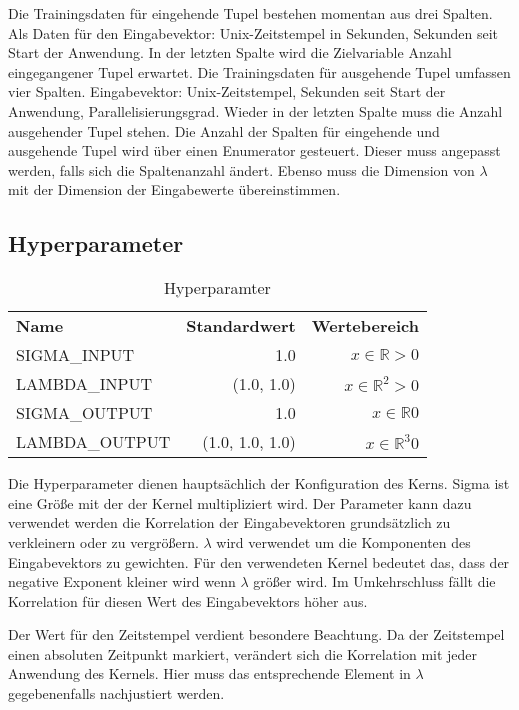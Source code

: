 Die Trainingsdaten für eingehende Tupel bestehen momentan aus drei Spalten.
Als Daten für den Eingabevektor: Unix-Zeitstempel in Sekunden, Sekunden seit Start der Anwendung.
In der letzten Spalte wird die Zielvariable Anzahl eingegangener Tupel erwartet.
Die Trainingsdaten für ausgehende Tupel umfassen vier Spalten.
Eingabevektor: Unix-Zeitstempel, Sekunden seit Start der Anwendung, Parallelisierungsgrad.
Wieder in der letzten Spalte muss die Anzahl ausgehender Tupel stehen.
Die Anzahl der Spalten für eingehende und ausgehende Tupel wird über einen Enumerator gesteuert.
Dieser muss angepasst werden, falls sich die Spaltenanzahl ändert.
Ebenso muss die Dimension von \(\lambda\) mit der Dimension der Eingabewerte übereinstimmen.

\subsection{Hyperparameter}

\begin{table}[!htbp]
\centering
\caption{Hyperparamter}
\begin{tabular}{l|r|r}
\hline
\textbf{Name} & \textbf{Standardwert} & \textbf{Wertebereich} \\
SIGMA\_INPUT & 1.0 & \(x \in \mathbb{R} > 0 \) \\
LAMBDA\_INPUT & (1.0, 1.0) &  \(x \in \mathbb{R}^2 > 0 \) \\
SIGMA\_OUTPUT & 1.0 & \(x \in \mathbb{R} 0 \) \\
LAMBDA\_OUTPUT & (1.0, 1.0, 1.0) & \(x \in \mathbb{R}^3 0\) \\
\hline
\end{tabular}
\end{table}

Die Hyperparameter dienen hauptsächlich der Konfiguration des Kerns.
Sigma ist eine Größe mit der der Kernel multipliziert wird.
Der Parameter kann dazu verwendet werden die Korrelation der Eingabevektoren grundsätzlich zu verkleinern oder zu vergrößern.
\(\lambda\) wird verwendet um die Komponenten des Eingabevektors zu gewichten.
Für den verwendeten Kernel bedeutet das, dass der negative Exponent kleiner wird wenn \(\lambda\) größer wird.
Im Umkehrschluss fällt die Korrelation für diesen Wert des Eingabevektors höher aus.

Der Wert für den Zeitstempel verdient besondere Beachtung.
Da der Zeitstempel einen absoluten Zeitpunkt markiert, verändert sich die Korrelation mit jeder Anwendung des Kernels.
Hier muss das entsprechende Element in \(\lambda\) gegebenenfalls nachjustiert werden.

